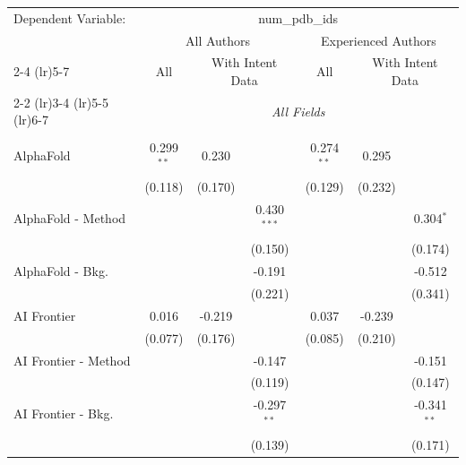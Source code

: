 \begingroup
\centering
\begin{tabular}{lcccccc}
   \tabularnewline \midrule \midrule
   Dependent Variable: & \multicolumn{6}{c}{num\_pdb\_ids}\\
 & \multicolumn{3}{c}{All Authors} & \multicolumn{3}{c}{Experienced Authors} \\
\cmidrule(lr){2-4} \cmidrule(lr){5-7}
 & \multicolumn{1}{c}{All} & \multicolumn{2}{c}{With Intent Data} & \multicolumn{1}{c}{All} & \multicolumn{2}{c}{With Intent Data} \\
\cmidrule(lr){2-2} \cmidrule(lr){3-4} \cmidrule(lr){5-5} \cmidrule(lr){6-7}
 & \multicolumn{6}{c}{\textit{All Fields}} \\ \\
   AlphaFold            & 0.299$^{**}$ & 0.230        &               & 0.274$^{**}$ & 0.295        &   \\   
                        & (0.118)      & (0.170)      &               & (0.129)      & (0.232)      &   \\   
   AlphaFold - Method   &              &              & 0.430$^{***}$ &              &              & 0.304$^{*}$\\   
                        &              &              & (0.150)       &              &              & (0.174)\\   
   AlphaFold - Bkg.     &              &              & -0.191        &              &              & -0.512\\   
                        &              &              & (0.221)       &              &              & (0.341)\\   
   AI Frontier          & 0.016        & -0.219       &               & 0.037        & -0.239       &   \\   
                        & (0.077)      & (0.176)      &               & (0.085)      & (0.210)      &   \\   
   AI Frontier - Method &              &              & -0.147        &              &              & -0.151\\   
                        &              &              & (0.119)       &              &              & (0.147)\\   
   AI Frontier - Bkg.   &              &              & -0.297$^{**}$ &              &              & -0.341$^{**}$\\   
                        &              &              & (0.139)       &              &              & (0.171)\\   

\end{tabular}
